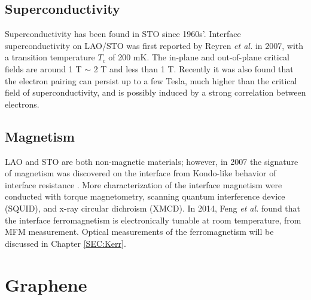 \documentclass[pdflatex, sectionletters, 12pt]{pittetd}    %
\begin{document}
\subsection{Superconductivity}

Superconductivity has been found in STO since 1960s'\cite{schooley1964superconductivity}. Interface superconductivity on LAO/STO was first reported by Reyren \textit{et al.} in 2007\cite{reyren2007superconducting}, with a transition temperature $T_c$ of 200 mK. The in-plane and out-of-plane critical fields are around 1 T $\sim$ 2 T and less than 1 T. Recently it was also found that the electron pairing can persist up to a few Tesla, much higher than the critical field of superconductivity, and is possibly induced by a strong correlation between electrons\cite{cheng2015electron, cheng2016tunable}.

\subsection{Magnetism}

LAO and STO are both non-magnetic materials; however, in 2007 the signature of magnetism was discovered on the interface from Kondo-like behavior of interface resistance \cite{brinkman2007magnetic}. More characterization of the interface magnetism were conducted with torque magnetometry\cite{li2011coexistence}, scanning quantum interference device (SQUID)\cite{bert2011direct}, and x-ray circular dichroism (XMCD)\cite{lee2013titanium}. In 2014, Feng \textit{et al.} found that the interface ferromagnetism is electronically tunable at room temperature, from MFM measurement\cite{bi2014room}. Optical measurements of the ferromagnetism will be discussed in Chapter \ref{SEC:Kerr}.

\section{Graphene}
\end{document}
